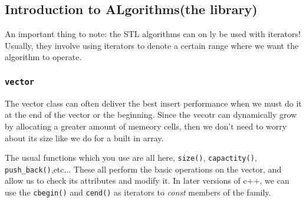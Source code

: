 \documentclass{article}
\begin{document}
\subsection{Introduction to ALgorithms(the library)}
An important thing to note: the STL algorithms can on ly be used with iterators! Usually, they involve using iterators to 
denote a certain range where we want the algorithm to operate.
\subsubsection{\texttt{vector}}
The vector class can often deliver the best insert performance when we must do it at the end of the vector or the beginning. 
Since the vecotr can dynamically grow by allocating a greater amount of memeory cells, then we don't need to worry about its 
size like we do for a built in array.

The usual functions which you use are all here, \texttt{size()}, \texttt{capactity()}, \texttt{push\_back()},etc... These 
all perform the basic operations on the vector, and allow us to check its attributes and modify it. In later versions of c++,
we can use the \texttt{cbegin()} and \texttt{cend()} as iterators to \textit{const} members of the family.
\end{document}
